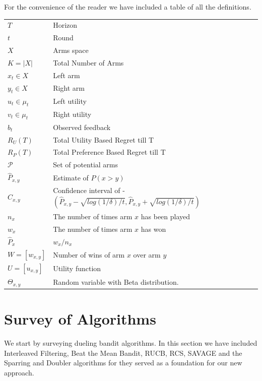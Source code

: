 \documentclass{llncs}
\begin{document}
For the convenience of the reader we have included a table of all the definitions. 
	\begin{table}[h]
		\begin{tabular}{ll}
 			$T$ & Horizon \\
 			$t$ &  Round \\
 			$X$ & Arms space \\
 			$K = |X|$ & Total Number of Arms\\
 			$x_t \in X$ & Left arm \\
 			$y_t \in X$ & Right arm \\
 			$u_t \in \mu_t$ & Left utility \\
 			$v_t \in \mu_t$ & Right utility \\
 			$b_t$ & Observed feedback \\
 			$R_U(T)$ & Total Utility Based Regret till T\\
			$R_P(T)$ & Total Preference Based Regret till T\\
 			$\mathcal{P}$ & Set of potential arms \\
 			$\hat{P}_{x, y}$ & Estimate of $P(x>y)$\\
 			$\hat{C}_{x, y}$ &   Confidence interval of - $(\hat{P}_{x, y} - \sqrt{log(1/\delta)/t},\hat{P}_{x, y} +\sqrt{log(1/\delta)/t})$\\
 			$n_x$ &   The number of times arm $x$ has been played\\
 			$w_x$ & The number of times arm $x$ has won\\
 			$\hat{P}_x  $ &  $ w_x / n_x $\\
 			$ W = [w_{x,y}]$ & Number of wins of arm $x$ over arm $y$\\
 			$U = [u_{x,y}]$ &  Utility function\\
 			$\Theta_{x,y}$ &   Random variable with Beta distribution.
		\end{tabular}
	\end{table}

\newpage

\section{Survey of Algorithms}
	We start by surveying dueling bandit algorithms. In this section we have included Interleaved Filtering, Beat the Mean Bandit, RUCB, RCS, SAVAGE and the Sparring and Doubler algorithms for they served as a foundation for our new approach.
	
\end{document}
